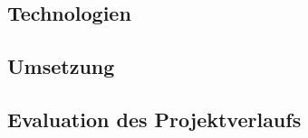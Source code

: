 \begin{spacing}{1}
	\chapter{Technologien}\label{chapter:tech}
\end{spacing}


\begin{spacing}{1}
	\chapter{Umsetzung}\label{chapter:implementation}
\end{spacing}


\begin{spacing}{1}
	\chapter{Evaluation des Projektverlaufs} %
\end{spacing}


\newpage
{}
\setcounter{page}{\value{RPages}}

\glsnogroupskiptrue
\printglossary[title=Glossar,toctitle=Glossar] %
\listoffigures
\listoftables
\lstlistoflistings
\appendix
{}




